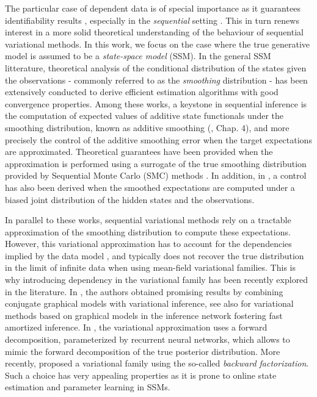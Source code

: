 \documentclass{article}
\begin{document}
The particular case of dependent data is of special importance as it guarantees identifiability results \cite{Khemakhem2020VariationalAA}, especially in the \textit{sequential} setting \cite{gassiat2020, Hlv2021DisentanglingIF}. 
This in turn renews interest in a more solid theoretical understanding of the behaviour of sequential variational methods.
In this work, we focus on the case where the true generative model is assumed to be a \textit{state-space model} (SSM). 
In the general SSM litterature, theoretical analysis of the conditional distribution of the states given the observations - commonly referred to as the \textit{smoothing} distribution - has been extensively conducted to derive efficient estimation algorithms with good convergence properties. Among these works, a keystone in sequential inference is the computation of expected values of additive state functionals under the smoothing distribution, known as additive smoothing (\cite{cappe2005inference}, Chap. 4), and more precisely the control of the additive smoothing error when the target expectations are approximated.  Theoretical guarantees have been provided when the approximation is performed using a surrogate of the true smoothing distribution provided by Sequential Monte Carlo (SMC) methods  \cite{douc2011sequential, dubarry2013non, olsson2017efficient, gloaguen2022pseudo}. 
In addition, in \cite{gloaguen2022pseudo}, a control has also been derived when the smoothed expectations are computed under a biased joint 
distribution of the hidden states and the observations.

In parallel to these works, sequential variational methods rely on a tractable approximation of the smoothing distribution to compute these expectations. However, this variational approximation has to  account for the  dependencies implied by the data model \cite{Bayer2021MindTG},  and typically does not recover the true distribution in the limit of infinite data when using mean-field variational families. This is why introducing dependency in the variational family has been recently explored in the literature. In \cite{johnson2016}, the authors obtained promising results by combining conjugate graphical models with 
variational inference, see also \cite{Lin2018VariationalMP} for variational methods based on graphical models in the inference network fostering fast amortized inference. 
In \cite{krishnan2017structured}, the
variational approximation uses a forward decomposition, parameterized by recurrent neural
networks,  which allows to mimic the forward decomposition of the true posterior distribution. More recently, \cite{campbell2021online} proposed a variational family using the so-called \textit{backward factorization}. Such a choice has very appealing properties as it is prone to  online state estimation and parameter learning in SSMs. 
 
\end{document}
